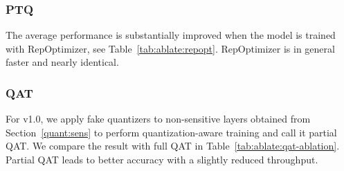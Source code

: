 \documentclass[10pt,twocolumn,letterpaper]{article}
\begin{document}
\subsubsection{PTQ}\label{sec:sub-ptq}
The average performance is substantially improved when the model is trained with RepOptimizer, see Table~\ref{tab:ablate:repopt}. RepOptimizer is in general faster and nearly identical.
  \begin{table}[ht]
    \begin{center}
    \end{center}
    \caption{PTQ performance of YOLOv6s trained with RepOptimizer.}
    \label{tab:ablate:repopt}
  \end{table}

\subsubsection{QAT}\label{sec:sub-qat}
For v1.0, we apply fake quantizers to non-sensitive layers obtained from Section~\ref{quant:sens} to perform quantization-aware training and call it partial QAT. We compare the result with full QAT in Table~\ref{tab:ablate:qat-ablation}.  Partial QAT leads to better accuracy with a slightly reduced throughput.
  
 \begin{table}[ht]
    \begin{center}
    \end{center}
    \caption{QAT performance of YOLOv6-S (v1.0) under different settings.}
    \label{tab:ablate:qat-ablation}
  \end{table}
  
\end{document}
